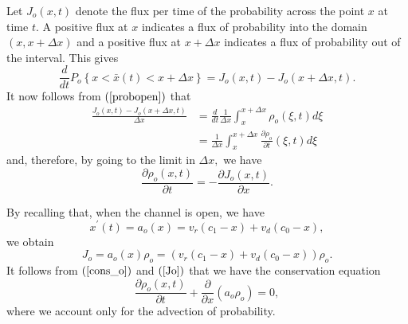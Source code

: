 Let $J_{o}(x,t)$ denote the flux per time of the probability across the point $x$ at time
$t.$ A positive flux at $x$ indicates a flux of probability into
the domain $\left(  x,x+\Delta x\right)$ and a positive flux at $x+\Delta
x$ indicates a flux of probability out of the interval. This gives%
\begin{equation}
\frac{d}{dt}P_{o}\left\{  x<\bar{x}(t)<x+\Delta x\right\}  =J_{o}(x,t)-J_{o}%
(x+\Delta x,t).\label{p2}%
\end{equation} 
It now follows from $\left(  \ref{probopen}\right)  $ that%
\begin{align*}
\frac{J_{o}(x,t)-J_{o}(x+\Delta x,t)}{\Delta x} &  =\frac{d}{dt}\frac
{1}{\Delta x}\int_{x}^{x+\Delta x}\rho_{o}\left(  \xi,t\right)  d\xi\\
&  =\frac{1}{\Delta x}\int_{x}^{x+\Delta x}\frac{\partial\rho_{o}}{\partial
t}\left(  \xi,t\right)  d\xi
\end{align*}
and, therefore, by going to the limit in $\Delta x,$ we have%
\begin{equation}
\frac{\partial\rho_{o}\left(  x,t\right)  }{\partial t}=-\frac{\partial
J_{o}(x,t)}{\partial x}.\label{cons_o}%
\end{equation}
\begin{comment}
Next, we have to consider about the size of the flux $J_{o}$. Let us start by
observing that the change in concentration $x$ over the time step $\Delta t$
is given by%
\[
\Delta x=x(t+\Delta t)-x(t)=x^{\prime}(t)\Delta t+O(\Delta t^{2}).
\]
Note also that the probability of the concentration being in that interval
(and the channel being open) is given by%
\[
\rho_{o}(x,t)\Delta x=\rho_{o}(x,t)x^{\prime}(t)\Delta t+O(\Delta t^{2})
\]
and then the flux of probability per time is given by
\[
J_{o}=\rho_{o}(x,t)\frac{\Delta x}{\Delta t}=\rho_{o}(x,t)x^{\prime
}(t)+O(\Delta t).
\] 
\end{comment}
By recalling that, when the channel is open, we have%
\[
x^{\prime}(t)=a_o(x)=v_{r}(c_{1}-x)+v_{d}(c_{0}-x),
\]
we obtain%
\begin{equation}
J_{o}=a_o(x)  \rho_{o}=\left(  v_{r}(c_{1}-x)+v_{d}(c_{0}-x)\right)  \rho_{o}.\label{Jo}%
\end{equation}
It follows from $\left(  \ref{cons_o}\right)  $ and 
$\left(  \ref{Jo}\right)  $ that we have the
conservation equation%
\begin{equation}
\frac{\partial\rho_{o}\left(  x,t\right)  }{\partial t}+\frac{\partial
}{\partial x}(a_o  \rho_{o})%
=0,\label{cons2}%
\end{equation}
where we account only for the advection of probability.

